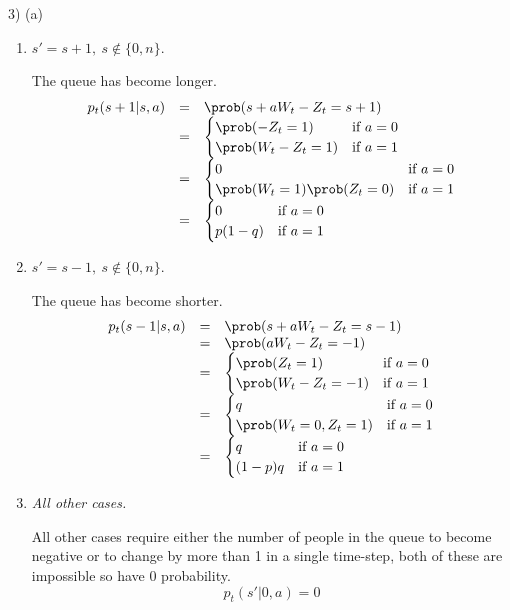 \documentclass[11pt,a4paper]{article}
\begin{document}
\begin{answer}{3) (a)}
\begin{itemize}
\begin{enumerate}
      \item $s'=s+1,\ s\not\in\{0,n\}$.
      \par The queue has become longer.
      \[\begin{array}{rcl}
        p_t(s+1|s,a)&=&\prob(s+aW_t-Z_t=s+1)\\
        &=&\begin{cases}
             \prob(-Z_t=1)&\text{if }a=0\\
             \prob(W_t-Z_t=1)&\text{if }a=1
           \end{cases}\\
        &=&\begin{cases}
             0&\text{if }a=0\\
             \prob(W_t=1)\prob(Z_t=0)&\text{if }a=1
           \end{cases}\\
        &=&\begin{cases}
             0&\text{if }a=0\\
             p(1-q)&\text{if }a=1
           \end{cases}
      \end{array}\]

      \item $s'=s-1,\ s\not\in\{0,n\}$.
      \par The queue has become shorter.
      \[\begin{array}{rcl}
        p_t(s-1|s,a)&=&\prob(s+aW_t-Z_t=s-1)\\
        &=&\prob(aW_t-Z_t=-1)\\
        &=&\begin{cases}
             \prob(Z_t=1)&\text{if }a=0\\
             \prob(W_t-Z_t=-1)&\text{if }a=1
           \end{cases}\\
        &=&\begin{cases}
             q&\text{if }a=0\\
             \prob(W_t=0,Z_t=1)&\text{if }a=1
           \end{cases}\\
        &=&\begin{cases}
             q&\text{if }a=0\\
             (1-p)q&\text{if }a=1
           \end{cases}
      \end{array}\]

      \item \textit{All other cases.}
      \par All other cases require either the number of people in the queue to become negative or to change by more than 1 in a single time-step, both of these are impossible so have 0 probability.
      \[ p_t(s'|0,a)=0 \]


\end{enumerate}
\end{itemize}
\end{answer}
\end{document}
